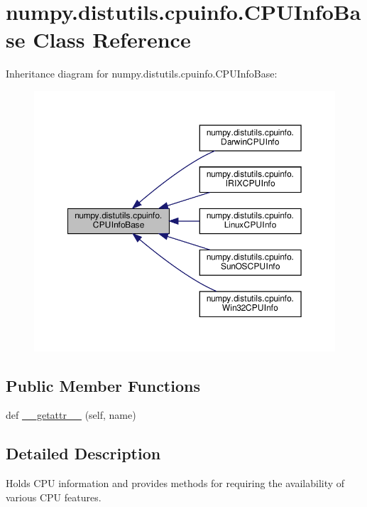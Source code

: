 \hypertarget{classnumpy_1_1distutils_1_1cpuinfo_1_1CPUInfoBase}{}\section{numpy.\+distutils.\+cpuinfo.\+C\+P\+U\+Info\+Base Class Reference}
\label{classnumpy_1_1distutils_1_1cpuinfo_1_1CPUInfoBase}


Inheritance diagram for numpy.\+distutils.\+cpuinfo.\+C\+P\+U\+Info\+Base\+:
\nopagebreak
\begin{figure}[H]
\begin{center}
\leavevmode
\includegraphics[width=350pt]{classnumpy_1_1distutils_1_1cpuinfo_1_1CPUInfoBase__inherit__graph}
\end{center}
\end{figure}
\subsection*{Public Member Functions}
\begin{DoxyCompactItemize}
\item 
def \hyperlink{classnumpy_1_1distutils_1_1cpuinfo_1_1CPUInfoBase_a3bdc629ec0638deeba3fb955ec399b3a}{\+\_\+\+\_\+getattr\+\_\+\+\_\+} (self, name)
\end{DoxyCompactItemize}


\subsection{Detailed Description}
\begin{DoxyVerb}Holds CPU information and provides methods for requiring
the availability of various CPU features.
\end{DoxyVerb}
 

